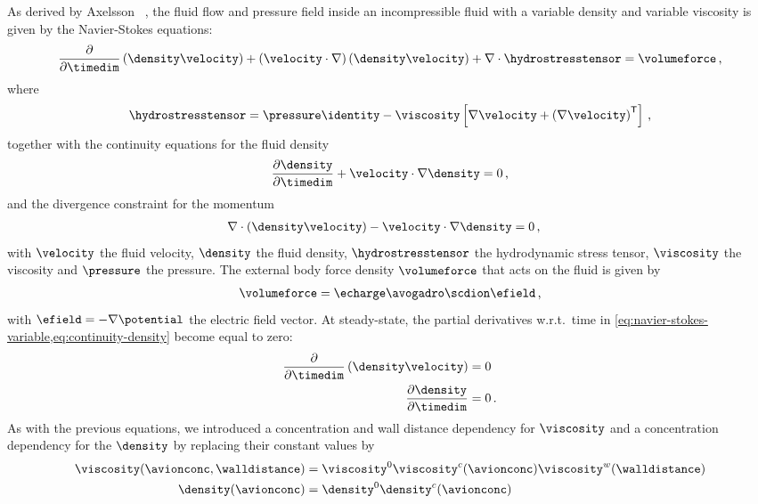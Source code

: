 As derived by Axelsson \etal{}~\cite{Axelsson-2015}, the fluid flow and pressure field inside an
incompressible fluid with a variable density and variable viscosity is given by the Navier-Stokes equations:
%
\begin{align}
  \label{eq:navier-stokes-variable}
  \dfrac{\partial}{\partial \timedim} \left( \density \velocity \right) +
  \left( \velocity \cdot \nabla \right) \left( \density\velocity \right)
  + \nabla \cdot \hydrostresstensor = \volumeforce
  \text{\,,}
\end{align}
%
where
%
\begin{align}
  \hydrostresstensor =
  \pressure\identity - \viscosity\left[\nabla\velocity+\left(\nabla\velocity \right)^\mathsf{T}\right]
  \text{\,,}
\end{align}
%
together with the continuity equations for the fluid density
%
\begin{align}
  \label{eq:continuity-density}
  \dfrac{\partial \density}{\partial \timedim} + \velocity \cdot \nabla \density  = 0
  \text{\,,}
\end{align}
%
and the divergence constraint for the momentum
%
\begin{align}
  \nabla \cdot \left( \density\velocity \right) - \velocity \cdot \nabla \density ={}& 0
  \text{\,,}
\end{align}
%
with $\velocity$ the fluid velocity, $\density$ the fluid density, $\hydrostresstensor$ the hydrodynamic
stress tensor, $\viscosity$ the viscosity and $\pressure$ the pressure. The external body force density
$\volumeforce$ that acts on the fluid is given by
%
\begin{align}\label{eq:ion_force_density}
  \volumeforce = \echarge\avogadro\scdion\efield
  \text{\,,}
\end{align}
%
with $\efield = - \nabla \potential$ the electric field vector. At steady-state, the partial derivatives
w.r.t.~time in \cref{eq:navier-stokes-variable,eq:continuity-density} become equal to zero:
%
\begin{align}
  \dfrac{\partial}{\partial \timedim} \left( \density \velocity \right) ={}& 0 \\
  \dfrac{\partial \density}{\partial \timedim} ={}& 0
  \text{\,.}
\end{align}
%
As with the previous equations, we introduced a concentration and wall distance dependency for $\viscosity$
and a concentration dependency for the $\density$ by replacing their constant values by
%
\begin{align}
  \viscosity(\avionconc,\walldistance) ={}&
    \viscosity^0 \viscosity^c(\avionconc) \viscosity^w(\walldistance) \\
  \density(\avionconc) ={}&
    \density^0 \density^c(\avionconc)
\end{align}
